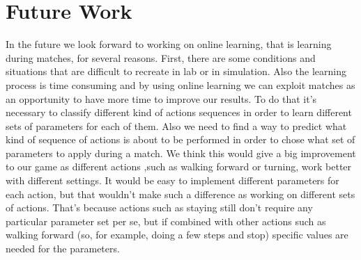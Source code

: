 \documentclass[a4paper, twocolumn]{article}
\begin{document}
 

\section{Future Work}
 

In the future we look forward to working on online learning, that is learning during matches, for several reasons. First, there are some conditions and situations that are difficult to recreate in lab or in simulation. Also the learning process is time consuming and by using online learning we can exploit matches as an opportunity to have more time to improve our results. To do that it's necessary to classify different kind of actions sequences in order to learn different sets of parameters for each of them. Also we need to find a way to predict what kind of sequence of actions is about to be performed in order to chose what set of parameters to apply during a match. We think this would give a big improvement to our game as different actions ,such as walking forward or turning, work better with different settings. It would be easy to implement different parameters for each action, but that wouldn't make such a difference as working on different sets of actions. That's because actions such as staying still don't require any particular parameter set per se, but if combined with other actions such as walking forward (so, for example, doing a few steps and stop) specific values are needed for the parameters. 




\end{document}
